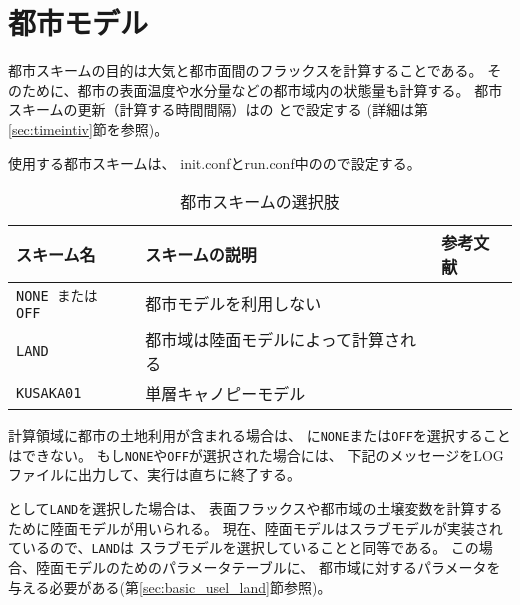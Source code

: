 \section{都市モデル} \label{sec:basic_usel_urban}
都市スキームの目的は大気と都市面間のフラックスを計算することである。
そのために、都市の表面温度や水分量などの都市域内の状態量も計算する。
都市スキームの更新（計算する時間間隔）はの
とで設定する
(詳細は第\ref{sec:timeintiv}節を参照)。


使用する都市スキームは、
init.confとrun.conf中のので設定する。
%

\begin{table}[h]
\begin{center}
  \caption{都市スキームの選択肢}
  \label{tab:nml_urban}
  \begin{tabularx}{150mm}{llX} \hline
    \rowcolor[gray]{0.9}  スキーム名  & スキームの説明 &  参考文献 \\ \hline
      \verb|NONE または OFF|   & 都市モデルを利用しない                      \\
      \verb|LAND|              & 都市域は陸面モデルによって計算される        \\
      \verb|KUSAKA01|          & 単層キャノピーモデル  & \citet{kusaka_2001} \\
    \hline
  \end{tabularx}
\end{center}
\end{table}

計算領域に都市の土地利用が含まれる場合は、
に\verb|NONE|または\verb|OFF|を選択することはできない。
もし\verb|NONE|や\verb|OFF|が選択された場合には、
下記のメッセージをLOGファイルに出力して、実行は直ちに終了する。
%

として\verb|LAND|を選択した場合は、
表面フラックスや都市域の土壌変数を計算するために陸面モデルが用いられる。
現在、陸面モデルはスラブモデルが実装されているので、\verb|LAND|は
スラブモデルを選択していることと同等である。
この場合、陸面モデルのためのパラメータテーブルに、
都市域に対するパラメータを与える必要がある(第\ref{sec:basic_usel_land}節参照)。

